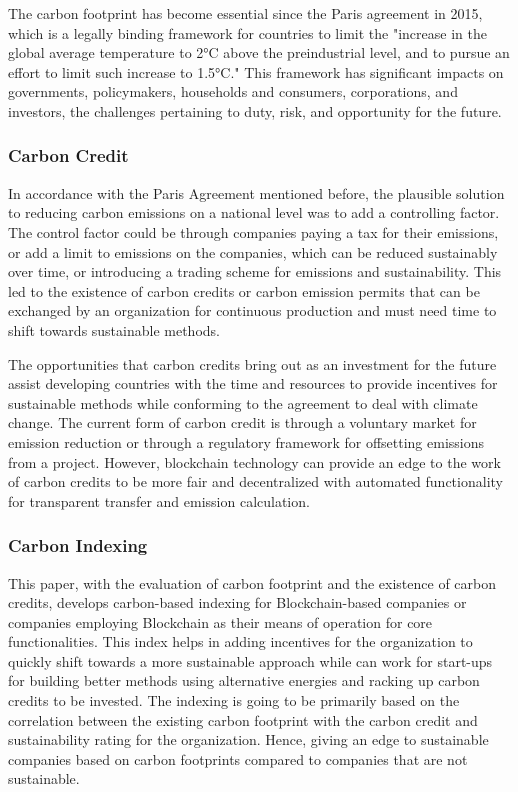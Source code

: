 \documentclass[11pt, a4paper]{article}
\begin{document}
The carbon footprint has become essential since the Paris agreement in 2015, which is a legally binding framework for countries to limit the "increase in the global average temperature to 2°C above the preindustrial level, and to pursue an effort to limit such increase to 1.5°C." This framework has significant impacts on governments, policymakers, households and consumers, corporations, and investors, the challenges pertaining to duty, risk, and opportunity for the future. \cite{de_franco_carbon_2018}

\subsubsection*{Carbon Credit} 

In accordance with the Paris Agreement mentioned before, the plausible solution to reducing carbon emissions on a national level was to add a controlling factor. The control factor could be through companies paying a tax for their emissions, or add a limit to emissions on the companies, which can be reduced sustainably over time, or introducing a trading scheme for emissions and sustainability. This led to the existence of carbon credits or carbon emission permits that can be exchanged by an organization for continuous production and must need time to shift towards sustainable methods.  \cite{franke_designing_2020}

The opportunities that carbon credits bring out as an investment for the future assist developing countries with the time and resources to provide incentives for sustainable methods while conforming to the agreement to deal with climate change. The current form of carbon credit is through a voluntary market for emission reduction or through a regulatory framework for offsetting emissions from a project. However, blockchain technology can provide an edge to the work of carbon credits to be more fair and decentralized with automated functionality for transparent transfer and emission calculation. \cite{ashley_establishing_2018}

\subsubsection*{Carbon Indexing} 

This paper, with the evaluation of carbon footprint and the existence of carbon credits, develops carbon-based indexing for Blockchain-based companies or companies employing Blockchain as their means of operation for core functionalities. This index helps in adding incentives for the organization to quickly shift towards a more sustainable approach while can work for start-ups for building better methods using alternative energies and racking up carbon credits to be invested. The indexing is going to be primarily based on the correlation between the existing carbon footprint with the carbon credit and sustainability rating for the organization. Hence, giving an edge to sustainable companies based on carbon footprints compared to companies that are not sustainable. \cite{crane_passive_2018}
\end{document}
